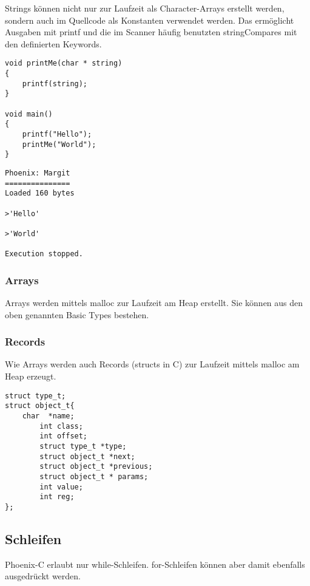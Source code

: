 \documentclass[a4paper,12pt]{article}
\begin{document}
	Strings können nicht nur zur Laufzeit als Character-Arrays erstellt werden, sondern auch im Quellcode als Konstanten verwendet werden.
	Das ermöglicht Ausgaben mit printf und die im Scanner häufig benutzten stringCompares mit den definierten Keywords.

	\begin{lstlisting}[title=string.c,frame=single]
void printMe(char * string)
{
	printf(string);
}

void main()
{
	printf("Hello");
	printMe("World");
}	\end{lstlisting}

	\begin{lstlisting}[title=Ausgabe der Target Machine,frame=single]
Phoenix: Margit
===============
Loaded 160 bytes

>'Hello'

>'World'

Execution stopped.
	\end{lstlisting}

	\subsubsection{Arrays}

	Arrays werden mittels malloc zur Laufzeit am Heap erstellt.
	Sie können aus den oben genannten Basic Types bestehen.
	
	\subsubsection{Records}

	Wie Arrays werden auch Records (structs in C) zur Laufzeit mittels malloc am Heap erzeugt.
	
	\begin{lstlisting}[title=Beispiel eines Structs das behandelt werden kann,frame=single]
struct type_t;
struct object_t{
	char  *name;
    	int class;
    	int offset;
    	struct type_t *type;
    	struct object_t *next;
    	struct object_t *previous;
    	struct object_t * params;
    	int value;
    	int reg;
}; \end{lstlisting}

	\subsection{Schleifen}

	Phoenix-C erlaubt nur while-Schleifen.
	for-Schleifen können aber damit ebenfalls ausgedrückt werden.
\end{document}
